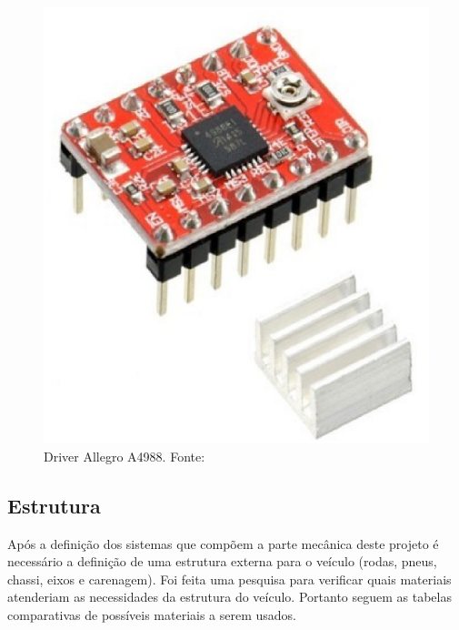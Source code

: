                 \begin{figure}[!h]
                	\centering
                	\includegraphics[keepaspectratio=true, scale=0.4]{figuras/drive_passo.eps}
                	\caption{Driver Allegro A4988. Fonte: \cite{flop}}
                	\label{fig:drivepasso}
                \end{figure}
                

      
  \subsection{Estrutura}
  Após a definição dos sistemas que compõem a parte mecânica deste projeto é necessário a definição de uma estrutura externa para o veículo (rodas, pneus, chassi, eixos e carenagem). Foi feita uma pesquisa para verificar quais materiais atenderiam as necessidades da estrutura do veículo. Portanto seguem as tabelas comparativas de possíveis materiais a serem usados.

